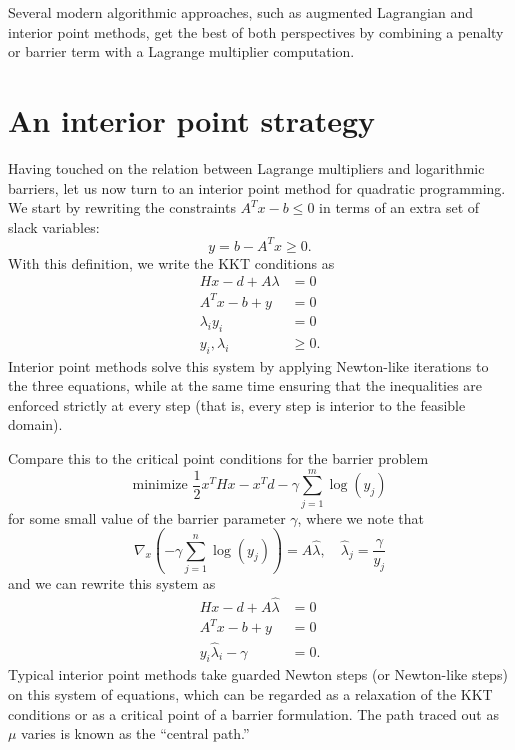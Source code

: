 \documentclass[12pt, leqno]{article} %
\begin{document}
Several modern algorithmic approaches, such as augmented Lagrangian and
interior point methods, get the best of both perspectives by combining a
penalty or barrier term with a Lagrange multiplier computation.

\section{An interior point strategy}

Having touched on the relation between Lagrange multipliers and
logarithmic barriers, let us now turn to an interior point method for
quadratic programming. We start by rewriting the constraints
\(A^Tx - b \leq 0\) in terms of an extra set of slack variables:
\[y = b-A^Tx \geq 0.\] With this definition, we write the KKT conditions
as \begin{align*}
  Hx - d + A\lambda & = 0 \\
  A^T x-b+y &= 0 \\
  \lambda_i y_i &= 0 \\
  y_i, \lambda_i & \geq 0.
\end{align*} Interior point methods solve this system by applying
Newton-like iterations to the three equations, while at the same time
ensuring that the inequalities are enforced strictly at every step (that
is, every step is interior to the feasible domain).

Compare this to the critical point conditions for the barrier problem
\[\mbox{minimize } \frac{1}{2} x^T H x - x^T d - \gamma \sum_{j=1}^m \log(y_j)\]
for some small value of the barrier parameter \(\gamma\), where we note
that \[\nabla_x \left( -\gamma \sum_{j=1}^n \log(y_j) \right) =
  A \hat{\lambda}, \quad \hat{\lambda}_j = \frac{\gamma}{y_j}\] and we
can rewrite this system as \begin{align*}
  Hx - d + A\hat{\lambda} &= 0 \\
  A^T x - b + y &= 0 \\
  y_i \hat{\lambda}_i - \gamma &= 0.
\end{align*} Typical interior point methods take guarded Newton steps
(or Newton-like steps) on this system of equations, which can be
regarded as a relaxation of the KKT conditions or as a critical point of
a barrier formulation. The path traced out as \(\mu\) varies is known as
the ``central path.''
\end{document}
